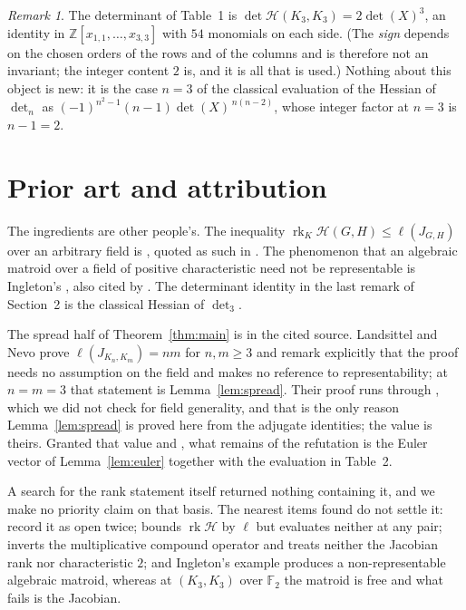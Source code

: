 \documentclass[11pt]{amsart}
\theoremstyle{remark}
\newtheorem*{remark}{Remark}
\DeclareMathOperator{\rk}{rk}
\newcommand{\Hm}{\mathcal H}
\newcommand{\FF}{\mathbb F}
\begin{document}
\begin{remark}
The determinant of Table~1 is
$\det\Hm(K_3,K_3)=2\det(X)^3$, an identity in
$\mathbb Z[x_{1,1},\ldots,x_{3,3}]$ with $54$ monomials on each side. (The
\emph{sign} depends on the chosen orders of the rows and of the columns and is
therefore not an invariant; the integer content $2$ is, and it is all that is
used.) Nothing about this object is new: it is the case $n=3$ of the classical
evaluation of the Hessian of $\det_n$ as
$(-1)^{n^2-1}(n-1)\det(X)^{\,n(n-2)}$, whose integer factor at $n=3$ is
$n-1=2$.
\end{remark}

\section{Prior art and attribution}

The ingredients are other people's. The inequality
$\rk_K\Hm(G,H)\le\ell(J_{G,H})$ over an arbitrary field is
\cite[Lemma 9]{BMS}, quoted as such in \cite{LN}. The phenomenon that an
algebraic matroid over a field of positive characteristic need not be
representable is Ingleton's \cite[p.~166, Example 15]{Ingleton}, also cited by
\cite{LN}. The determinant identity in the last remark of Section~2 is the
classical Hessian of $\det_3$.

The spread half of Theorem~\ref{thm:main} is in the cited source. Landsittel
and Nevo prove $\ell(J_{K_n,K_m})=nm$ for $n,m\ge3$ and remark explicitly that
the proof needs no assumption on the field and makes no reference to
representability; at $n=m=3$ that statement is Lemma~\ref{lem:spread}. Their
proof runs through \cite[Theorem 1]{DOG}, which we did not check for field
generality, and that is the only reason Lemma~\ref{lem:spread} is proved here
from the adjugate identities; the value is theirs. Granted that value and
\cite[Lemma 9]{BMS}, what remains of the refutation is the Euler vector of
Lemma~\ref{lem:euler} together with the evaluation in Table~2.

A search for the rank statement itself returned nothing containing it, and we
make no priority claim on that basis. The nearest items found do not settle it:
\cite{LN} record it as open twice; \cite{BMS} bounds $\rk\Hm$ by $\ell$ but
evaluates neither at any pair; \cite{DOG} inverts the multiplicative compound
operator and treats neither the Jacobian rank nor characteristic $2$; and
Ingleton's example produces a non-representable algebraic matroid, whereas at
$(K_3,K_3)$ over $\FF_2$ the matroid is free and what fails is the Jacobian.
\end{document}
